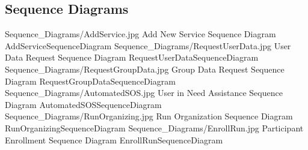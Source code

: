 \documentclass[../../../rasd.tex]{subfiles}
\begin{document}
\subsection{Sequence Diagrams\label{sect:3.2.4}}
\image {13cm} {Sequence_Diagrams/AddService.jpg} {Add New Service Sequence Diagram} {AddServiceSequenceDiagram}
\image {13cm} {Sequence_Diagrams/RequestUserData.jpg} {User Data Request Sequence Diagram} {RequestUserDataSequenceDiagram}
\image {13cm} {Sequence_Diagrams/RequestGroupData.jpg} {Group Data Request Sequence Diagram} {RequestGroupDataSequenceDiagram}
\image {13cm} {Sequence_Diagrams/AutomatedSOS.jpg} {User in Need Assistance Sequence Diagram} {AutomatedSOSSequenceDiagram}
\image {13cm} {Sequence_Diagrams/RunOrganizing.jpg} {Run Organization Sequence Diagram} {RunOrganizingSequenceDiagram}
\image {13cm} {Sequence_Diagrams/EnrollRun.jpg} {Participant Enrollment Sequence Diagram} {EnrollRunSequenceDiagram}
\end{document}
